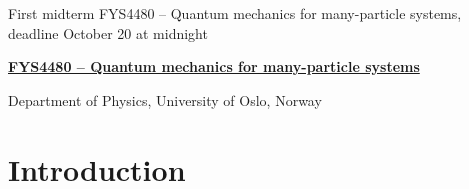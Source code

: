 \documentclass[a4wide,10pt]{article}
\begin{document}

\newcommand{\exercisesection}[1]{\subsection*{#1}}






\thispagestyle{empty}

\begin{center}
{\LARGE\bf
\begin{spacing}{1.25}
First midterm FYS4480 – Quantum mechanics for many-particle systems, deadline October 20 at midnight
\end{spacing}
}
\end{center}


\begin{center}
{\bf \href{{http://www.uio.no/studier/emner/matnat/fys/FYS4480/index-eng.html}}{FYS4480 – Quantum mechanics for many-particle systems}}
\end{center}

    \begin{center}
\centerline{{\small Department of Physics, University of Oslo, Norway}}
\end{center}

\section*{Introduction}
\end{document}
